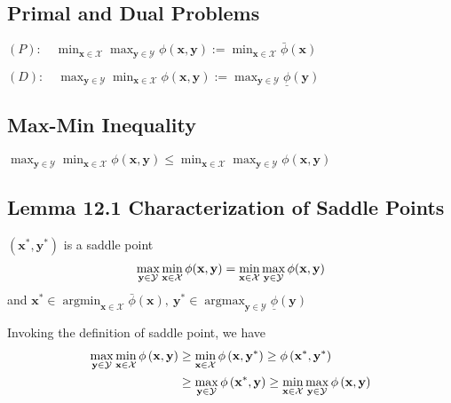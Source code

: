 \subsection*{Primal and Dual Problems}
$(P): \displaystyle\quad \min _{\mathbf{x} \in \mathcal{X}} \max _{\mathbf{y} \in \mathcal{Y}} \phi(\mathbf{x}, \mathbf{y}):=\min _{\mathbf{x} \in \mathcal{X}} \bar{\phi}(\mathbf{x})$

$(D): \displaystyle \quad \max _{\mathbf{y} \in \mathcal{Y}} \min _{\mathbf{x} \in \mathcal{X}} \phi(\mathbf{x}, \mathbf{y}):=\max _{\mathbf{y} \in \mathcal{Y}} \underline{\phi}(\mathbf{y})$





\subsection*{Max-Min Inequality}
$\displaystyle \max _{\mathbf{y} \in \mathcal{Y}} \min _{\mathbf{x} \in \mathcal{X}} \phi(\mathbf{x}, \mathbf{y}) \leq \min _{\mathbf{x} \in \mathcal{X}} \max _{\mathbf{y} \in \mathcal{Y}} \phi(\mathbf{x}, \mathbf{y})$




\subsection*{Lemma 12.1 Characterization of Saddle Points}
$\left(\mathbf{x}^{*}, \mathbf{y}^{*}\right)$ is a saddle point 
$$
\max _{\mathbf{y} \in \mathcal{Y}} \min _{\mathbf{x} \in \mathcal{X}} \phi(\mathbf{x}, \mathbf{y}) =\min _{\mathbf{x} \in \mathcal{X}} \max _{\mathbf{y} \in \mathcal{Y}} \phi(\mathbf{x}, \mathbf{y}) \\
$$
and $\mathbf{x}^{*} \in \operatorname{argmin}_{\mathbf{x} \in \mathcal{X}} \bar{\phi}(\mathbf{x}), \ \mathbf{y}^{*} \in \operatorname{argmax}_{\mathbf{y} \in \mathcal{Y}} \underline{\phi}(\mathbf{y})$



Invoking the definition of saddle point, we have
$$
\begin{aligned}
   \max_{\operatorname{\boldsymbol{\mathbf{y}}} \in \mathcal{Y}}\min _{\mathbf{x} \in \mathcal{X}} \phi\left(\mathbf{x}, \mathbf{y}\right) &\geq \min _{\mathbf{x} \in \mathcal{X}} \phi\left(\mathbf{x}, \mathbf{y}^{*}\right) \geq \phi\left(\mathbf{x}^{*}, \mathbf{y}^{*}\right) \\
   &\geq \max _{\mathbf{y} \in \mathcal{Y}} \phi\left(\mathbf{x}^{*}, \mathbf{y}\right) 
   \geq \min_{\operatorname{\boldsymbol{\mathbf{x}}} \in \mathcal{X}} \max _{\mathbf{y} \in \mathcal{Y}} \phi\left(\mathbf{x}, \mathbf{y}\right) 
\end{aligned}
$$




